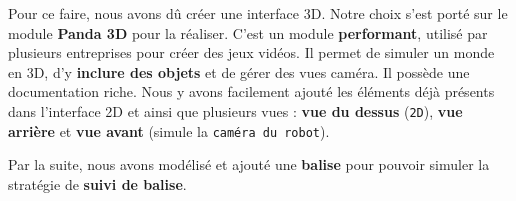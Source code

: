 \documentclass[12pt]{article}
\begin{document}
\hspace{\parindent}Pour ce faire, nous avons dû créer une interface 3D. Notre choix s'est porté sur le module \textbf{Panda 3D} pour la réaliser. C’est un module \textbf{performant}, utilisé par plusieurs entreprises pour créer des jeux vidéos. Il permet de simuler un monde en 3D, d’y \textbf{inclure des objets} et de gérer des vues caméra. Il possède une documentation riche. Nous y avons facilement ajouté les éléments déjà présents dans l'interface 2D et ainsi que plusieurs vues : \textbf{vue du dessus} (\texttt{2D}), \textbf{vue arrière} et \textbf{vue avant} (simule la \texttt{caméra du robot}).

\hspace{\parindent}Par la suite, nous avons modélisé et ajouté une \textbf{balise} pour pouvoir simuler la stratégie de \textbf{suivi de balise}.
\end{document}

